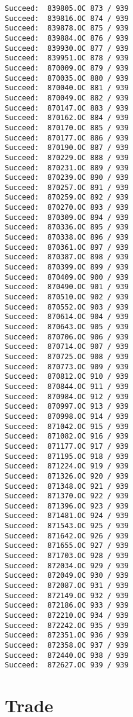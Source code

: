 \documentclass[11pt]{article}
\begin{document}
\begin{verbatim}
Succeed:  839805.OC 873 / 939
Succeed:  839816.OC 874 / 939
Succeed:  839878.OC 875 / 939
Succeed:  839884.OC 876 / 939
Succeed:  839930.OC 877 / 939
Succeed:  839951.OC 878 / 939
Succeed:  870009.OC 879 / 939
Succeed:  870035.OC 880 / 939
Succeed:  870040.OC 881 / 939
Succeed:  870049.OC 882 / 939
Succeed:  870147.OC 883 / 939
Succeed:  870162.OC 884 / 939
Succeed:  870170.OC 885 / 939
Succeed:  870177.OC 886 / 939
Succeed:  870190.OC 887 / 939
Succeed:  870229.OC 888 / 939
Succeed:  870231.OC 889 / 939
Succeed:  870239.OC 890 / 939
Succeed:  870257.OC 891 / 939
Succeed:  870259.OC 892 / 939
Succeed:  870270.OC 893 / 939
Succeed:  870309.OC 894 / 939
Succeed:  870336.OC 895 / 939
Succeed:  870338.OC 896 / 939
Succeed:  870361.OC 897 / 939
Succeed:  870387.OC 898 / 939
Succeed:  870399.OC 899 / 939
Succeed:  870409.OC 900 / 939
Succeed:  870490.OC 901 / 939
Succeed:  870510.OC 902 / 939
Succeed:  870552.OC 903 / 939
Succeed:  870614.OC 904 / 939
Succeed:  870643.OC 905 / 939
Succeed:  870706.OC 906 / 939
Succeed:  870714.OC 907 / 939
Succeed:  870725.OC 908 / 939
Succeed:  870773.OC 909 / 939
Succeed:  870812.OC 910 / 939
Succeed:  870844.OC 911 / 939
Succeed:  870984.OC 912 / 939
Succeed:  870997.OC 913 / 939
Succeed:  870998.OC 914 / 939
Succeed:  871042.OC 915 / 939
Succeed:  871082.OC 916 / 939
Succeed:  871177.OC 917 / 939
Succeed:  871195.OC 918 / 939
Succeed:  871224.OC 919 / 939
Succeed:  871326.OC 920 / 939
Succeed:  871348.OC 921 / 939
Succeed:  871370.OC 922 / 939
Succeed:  871396.OC 923 / 939
Succeed:  871481.OC 924 / 939
Succeed:  871543.OC 925 / 939
Succeed:  871642.OC 926 / 939
Succeed:  871655.OC 927 / 939
Succeed:  871703.OC 928 / 939
Succeed:  872034.OC 929 / 939
Succeed:  872049.OC 930 / 939
Succeed:  872087.OC 931 / 939
Succeed:  872149.OC 932 / 939
Succeed:  872186.OC 933 / 939
Succeed:  872210.OC 934 / 939
Succeed:  872242.OC 935 / 939
Succeed:  872351.OC 936 / 939
Succeed:  872358.OC 937 / 939
Succeed:  872440.OC 938 / 939
Succeed:  872627.OC 939 / 939
\end{verbatim}


\section{Trade}
\label{sec:org3ca98e6}
\end{document}
